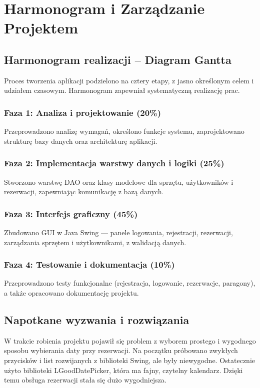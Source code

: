 \chapter{Harmonogram i Zarządzanie Projektem}
\label{cha:harmonogramizarzadzanie}

\section{Harmonogram realizacji – Diagram Gantta}
\label{sec:diagramGanta}
Proces tworzenia aplikacji podzielono na cztery etapy, z jasno określonym celem i udziałem czasowym. Harmonogram zapewniał systematyczną realizację prac.

\subsection{Faza 1: Analiza i projektowanie (20\%) }
\label{sec:wykorzystaneTechnologie}
Przeprowadzono analizę wymagań, określono funkcje systemu, zaprojektowano strukturę bazy danych oraz architekturę aplikacji.



\subsection{Faza 2: Implementacja warstwy danych i logiki (25\%)}
\label{sec:wykorzystaneTechnologie}
Stworzono warstwę DAO oraz klasy modelowe dla sprzętu, użytkowników i rezerwacji, zapewniając komunikację z bazą danych.

\subsection{Faza 3: Interfejs graficzny (45\%)}
\label{sec:wykorzystaneTechnologie}
Zbudowano GUI w Java Swing — panele logowania, rejestracji, rezerwacji, zarządzania sprzętem i użytkownikami, z walidacją danych.



\subsection{Faza 4: Testowanie i dokumentacja (10\%)}
\label{sec:wykorzystaneTechnologie}
Przeprowadzono testy funkcjonalne (rejestracja, logowanie, rezerwacje, paragony), a także opracowano dokumentację projektu.

\section{Napotkane wyzwania i rozwiązania}
\label{sec:wyzwaniairozwiazania}
W trakcie robienia projektu pojawił się problem z wyborem prostego i wygodnego sposobu wybierania daty przy rezerwacji. Na początku próbowano zwykłych przycisków i list rozwijanych z biblioteki Swing, ale były niewygodne. Ostatecznie użyto biblioteki LGoodDatePicker, która ma fajny, czytelny kalendarz. Dzięki temu obsługa rezerwacji stała się dużo wygodniejsza.
